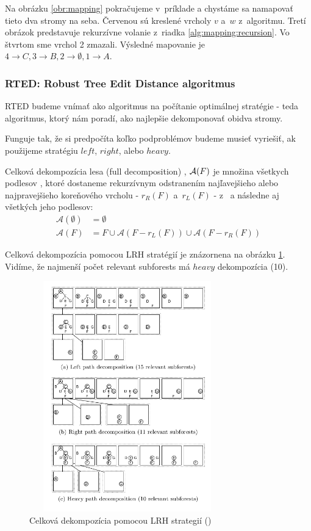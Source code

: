 Na obrázku \ref{obr:mapping} pokračujeme v~príklade a chystáme sa namapovať tieto
dva stromy na seba. Červenou sú kreslené vrcholy $v$ a~$w$ z~algoritmu.
Tretí obrázok predstavuje rekurzívne volanie z~riadka \ref{alg:mapping:recursion}.
Vo štvrtom sme vrchol 2 zmazali.
Výsledné mapovanie je $4 \to C, 3 \to B, 2 \to \emptyset, 1 \to A$.





\subsubsection{RTED: Robust Tree Edit Distance algoritmus}

RTED budeme vnímať ako algoritmus na počítanie optimálnej stratégie - teda algoritmus,
ktorý nám poradí, ako najlepšie dekomponovať obidva stromy.

Funguje tak, že si predpočíta koľko podproblémov budeme musieť vyriešiť, ak použijeme stratégiu
$left$, $right$, alebo $heavy$.

\begin{definice}
  Celková dekompozícia lesa (full decomposition) , $\mathcal{A}(F)$ je množina
  všetkych podlesov , ktoré dostaneme rekurzívnym odstranením najľavejšieho
  alebo najpravejšieho koreňového vrcholu - $r_{R}(F)$ a~$r_{L}(F)$ - z~
	a následne aj všetkých jeho podlesov:
	\begin{align*}
		\mathcal{A}(\emptyset) &= \emptyset
		\\
		\mathcal{A}(F) &= {F} \cup \mathcal{A}(F - r_{L}(F)) \cup \mathcal{A}(F - r_{R}(F))
	\end{align*}
\end{definice}

Celková dekompozícia pomocou LRH stratégií je znázornena na obrázku \ref{obr:LRH_decomposition}.
Vidíme, že najmenší počet relevant subforests má $heavy$ dekompozícia (10).

\begin{figure}
\centering
\includegraphics[width=85mm, height=100mm]{../img/LRH_decomposition.png}
\caption{Celková dekompozícia pomocou LRH strategií (\citet{RTED})}
\label{obr:LRH_decomposition}
\end{figure}

